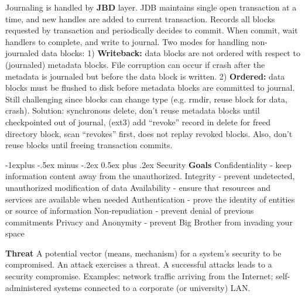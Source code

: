 \documentclass[6pt,landscape]{article}
\makeatletter
\renewcommand{\subsection}{\@startsection{subsection}{2}{0mm}%
                                {-1explus -.5ex minus -.2ex}%
                                {0.5ex plus .2ex}%
                                {\normalfont\normalsize\bfseries}}
\makeatother
\begin{document}
\begin{multicols}{3}
Journaling is handled by {\bf JBD} layer. JDB maintains single open transaction at a time, and new handles are added to current transaction. Records all blocks requested by transaction and periodically decides to commit. When commit, wait handlers to complete, and write to journal.
Two modes for handling non-journaled data blocks: 1) {\bf Writeback:} data blocks are not ordered with respect to (journaled) metadata blocks. File corruption can occur if crash after the metadata is journaled but before the data block is written.
2) {\bf Ordered:} data blocks must be flushed to disk before metadata blocks are committed to journal. Still challenging since blocks can change type (e.g. rmdir, reuse block for data, crash). Solution: synchronous delete, don't reuse metadata blocks until checkpointed out of journal, (ext3) add ``revoke'' record in delete for freed directory block, scan ``revokes'' first, does not replay revoked blocks. Also, don't reuse blocks until freeing transaction commits.



\subsection{Security}
{\bf Goals} Confidentiality - keep information content away from the unauthorized.
Integrity - prevent undetected, unauthorized modification of data
Availability - ensure that resources and services are available when needed
Authentication - prove the identity of entities or source of information
Non-repudiation - prevent denial of previous commitments
Privacy and Anonymity - prevent Big Brother from invading your space

{\bf Threat} A potential vector (means, mechanism) for a system’s security to be compromised. An attack exercises a threat. A successful attacks leads to a security compromise. Examples: network traffic arriving from the Internet; self-administered systems connected to a corporate (or university) LAN.


\end{multicols}
\end{document}
